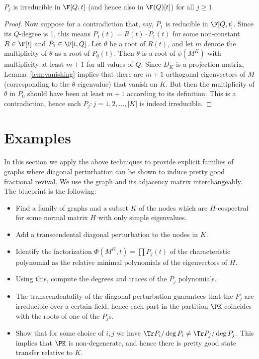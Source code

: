 \begin{theorem}\label{thm:irreducible}
$P_j$ is irreducible in $\F[Q,t]$ (and hence also in $\F(Q)[t]$) for all $j \geq 1$.
\end{theorem}
\begin{proof}

Now suppose for a contradiction that, say, $P_1$ is reducible in $\F[Q,t]$. Since its $Q$-degree is 1, this means $P_1(t) = R(t) \cdot \tilde{P}_1(t)$ for some non-constant $R \in \F[t]$ and $\tilde{P}_1 \in \F[t,Q]$. Let $\theta$ be a root of $R(t)$, and let $m$ denote the multiplicity of $\theta$ as a root of $P_0(t)$.
Then $\theta$ is a root of $\phi(M^K)$ with multiplicity at least $m+1$ for all values of $Q$. Since $D_K$ is a projection matrix, Lemma~\ref{lem:vanishing} implies that there are $m+1$ orthogonal eigenvectors of $M$ (corresponding to the $\theta$ eigenvalue) that vanish on $K$. But then the multiplicity of $\theta$ in $P_0$ should have been at least $m+1$ according to its definition. This is a contradiction, hence each $P_j : j=1,2,\dots,|K|$ is indeed irreducible.  
\end{proof}

\section{Examples}\label{sec:examples}

In this section we apply the above techniques to provide explicit families of graphs where diagonal perturbation can be shown to induce pretty good fractional revival. We use the graph and its adjacency matrix interchangeably. The blueprint is the following:
\begin{itemize}
\item Find a family of graphs and a subset $K$ of the nodes which are $H$-cospectral for some normal matrix $H$ with only simple eigenvalues.
\item Add a transcendental diagonal perturbation to the nodes in $K$.
\item Identify the factorization $\Phi(M^K,t) = \prod P_j(t)$ of the characteristic polynomial as the relative minimal polynomials of the eigenvectors of $H$. 
\item Using this, compute the degrees and traces of the $P_j$ polynomials.
\item The transcendentality of the diagonal perturbation guarantees that the $P_j$ are irreducible over a certain field, hence each part in the partition $\PK$ coincides with the roots of one of the $P_j$s. 
\item Show that for some choice of $i,j$ we have $\Tr P_i / \deg P_i \neq \Tr P_j /\deg P_j$. This implies that $\PK$ is non-degenerate, and hence there is pretty good state transfer relative to $K$. 
\end{itemize}

